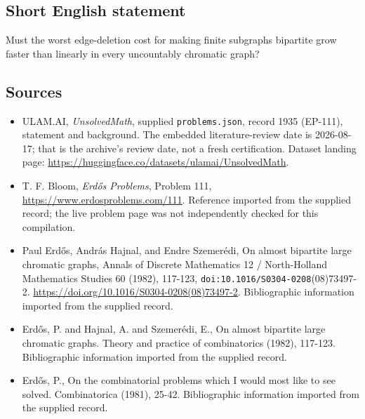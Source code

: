 \documentclass[11pt,a4paper]{article}
\begin{document}
\subsection{Short English statement}

Must the worst edge-deletion cost for making finite subgraphs bipartite grow faster than linearly in every uncountably chromatic graph?

\subsection{Sources}

{\small

\begin{itemize}

\item[\hypertarget{source:1935:1}{S1}] ULAM.AI, \emph{UnsolvedMath}, supplied \texttt{problems.json}, record 1935 (EP-111), statement and background. The embedded literature-review date is 2026-08-17; that is the archive’s review date, not a fresh certification. Dataset landing page: \url{https://huggingface.co/datasets/ulamai/UnsolvedMath}.

\item[\hypertarget{source:1935:2}{S2}] T. F. Bloom, \emph{Erdős Problems}, Problem 111, \url{https://www.erdosproblems.com/111}. Reference imported from the supplied record; the live problem page was not independently checked for this compilation.

\item[\hypertarget{source:1935:3}{S3}] Paul Erdős, András Hajnal, and Endre Szemerédi, On almost bipartite large chromatic graphs, Annals of Discrete Mathematics 12 / North-Holland Mathematics Studies 60 (1982), 117-123, \nolinkurl{doi:10.1016/S0304-0208}(08)73497-2. \url{https://doi.org/10.1016/S0304-0208(08)73497-2}. Bibliographic information imported from the supplied record.

\item[\hypertarget{source:1935:4}{S4}] Erd\H{o}s, P. and Hajnal, A. and Szemer\'{e}di, E., On almost bipartite large chromatic graphs. Theory and practice of combinatorics (1982), 117-123. Bibliographic information imported from the supplied record.

\item[\hypertarget{source:1935:5}{S5}] Erd\H{o}s, P., On the combinatorial problems which I would most like to see solved. Combinatorica (1981), 25-42. Bibliographic information imported from the supplied record.

\end{itemize}

}

\label{end:1935}
\end{document}
